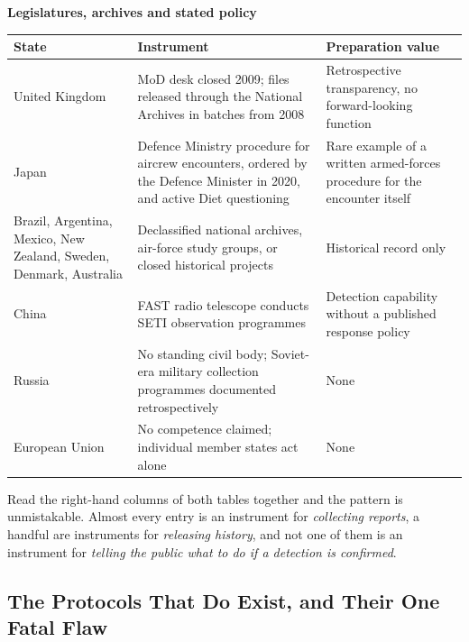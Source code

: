 \begin{center}\small
\textbf{\textcolor{ufogreenink}{Legislatures, archives and stated policy}}\par\vspace{4pt}
\begin{tabular}{@{}p{}p{}p{}@{}}
\toprule
\textbf{State} & \textbf{Instrument} & \textbf{Preparation value}\\
\midrule
United Kingdom & MoD desk closed 2009; files released through the National Archives in batches from
2008 & Retrospective transparency, no forward-looking function\\[3pt]
Japan & Defence Ministry procedure for aircrew encounters, ordered by the Defence Minister in 2020,
and active Diet questioning & Rare example of a written armed-forces procedure for the encounter
itself\\[3pt]
Brazil, Argentina, Mexico, New Zealand, Sweden, Denmark, Australia & Declassified national
archives, air-force study groups, or closed historical projects & Historical record only\\[3pt]
China & FAST radio telescope conducts SETI observation programmes & Detection capability without a
published response policy\\[3pt]
Russia & No standing civil body; Soviet-era military collection programmes documented
retrospectively & None\\[3pt]
European Union & No competence claimed; individual member states act alone & None\\
\bottomrule
\end{tabular}
\end{center}

Read the right-hand columns of both tables together and the pattern is unmistakable. Almost every
entry is an instrument for \emph{collecting reports}, a handful are instruments for
\emph{releasing history}, and not one of them is an instrument for \emph{telling the public what to
do if a detection is confirmed}. 

\subsection{The Protocols That Do Exist, and Their One Fatal Flaw}

